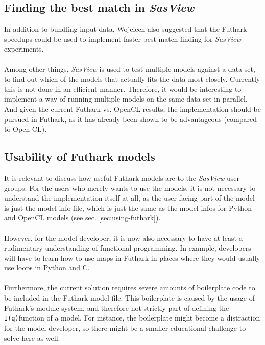 \documentclass[11pt]{article}
\newcommand{\sasview}{\textit{SasView}}
\newcommand{\iq}{\texttt{I(q)}}
\begin{document}
\subsection{Finding the best match in \sasview}
\label{sec:best-match}
In addition to bundling input data, Wojciech also suggested that the Futhark
speedups could be used to implement faster best-match-finding for \sasview
experiments.
\\\\
Among other things, \sasview{} is used to test multiple models against a data set,
to find out which of the models that actually fits the data most closely.
Currently this is not done in an efficient manner.
Therefore, it would be interesting to implement a way of running multiple models
on the same data set in parallel.
And given the current Futhark vs. OpenCL results, the implementation should
be pursued in Futhark, as it has already been shown to be advantageous
(compared to Open CL).


\subsection{Usability of Futhark models}
It is relevant to discuss how useful Futhark models are to the \sasview{} user
groups. For the users who merely wants to use the models, it is not necessary
to understand the implementation itself at all, as the user facing part of
the model is just the model info file, which is just the same as the model infos
for Python and OpenCL models (see sec. \ref{sec:using-futhark}).
\\\\
However, for the model developer, it is now also necessary to have at least a
rudimentary understanding of functional programming.
In example, developers will have to learn how to use maps in Futhark in
places where they would usually use loops in Python and C.
\\\\
Furthermore, the current solution requires severe amounts of boilerplate code to
be included in the Futhark model file.
This boilerplate is caused by the usage of Futhark's module system, and
therefore not strictly part of defining the \iq function of a model.
For instance, the boilerplate might become a distraction for the model developer, so
there might be a smaller educational challenge to solve here as well.
\\\\
\end{document}
